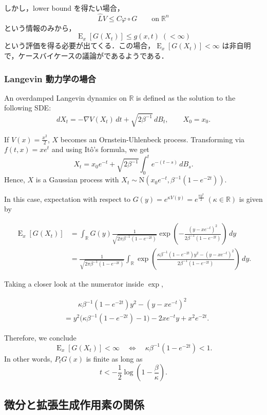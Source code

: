 \documentclass[
  11pt,
  jafont=noto-otf]{bxjsarticle}
\begin{document}
しかし，lower bound を得たい場合， \[
\widehat{L}V\le C\varphi\circ G\qquad\mathrm{on}\;\mathbb{R}^n
\] という情報のみから， \[
\operatorname{E}_x[G(X_t)]\le g(x,t)\;(<\infty)
\]
という評価を得る必要が出てくる．この場合，\(\operatorname{E}_x[G(X_t)]<\infty\)
は非自明で，ケースバイケースの議論がであるようである．

\subsubsection{Langevin
動力学の場合}\label{langevin-ux52d5ux529bux5b66ux306eux5834ux5408}

An overdamped Langevin dynamics on \(\mathbb{R}\) is defined as the
solution to the following SDE: \[
dX_t=-\nabla V(X_t)\,dt+\sqrt{2\beta^{-1}}\,dB_t,\qquad X_0=x_0.
\]

If \(V(x)=\frac{x^2}{2}\), \(X\) becomes an Ornstein-Uhlenbeck process.
Transforming via \(f(t,x)=xe^t\) and using Itô's formula, we get \[
X_t=x_0e^{-t}+\sqrt{2\beta^{-1}}\int^t_0e^{-(t-s)}\,dB_s.
\] Hence, \(X\) is a Gaussian process with
\(X_t\sim\mathrm{N}\left(x_0e^{-t},\beta^{-1}(1-e^{-2t})\right)\).

In this case, expectation with respect to
\(G(y)=e^{\kappa V(y)}=e^{\frac{\kappa y^2}{2}}\;(\kappa\in\mathbb{R})\)
is given by

\begin{align*}
    \operatorname{E}_x[G(X_t)]&=\int_{\mathbb{R}} G(y)\frac{1}{\sqrt{2\pi\beta^{-1}(1-e^{-2t})}}\exp\left(-\frac{(y-xe^{-t})^2}{2\beta^{-1}(1-e^{-2t})}\right)\,dy\\
    &=\frac{1}{\sqrt{2\pi\beta^{-1}(1-e^{-2t})}}\int_{\mathbb{R}}\exp\left(\frac{\kappa\beta^{-1}(1-e^{-2t})y^2-(y-xe^{-t})^2}{2\beta^{-1}(1-e^{-2t})}\right)\,dy.
\end{align*}

Taking a closer look at the numerator inside \(\exp\),

\begin{align*}
    &\qquad\kappa\beta^{-1}(1-e^{-2t})y^2-(y-xe^{-t})^2\\
    &=y^2\biggr(\kappa\beta^{-1}(1-e^{-2t})-1\biggl)-2xe^{-t}y+x^2e^{-2t}.
\end{align*}

Therefore, we conclude \[
\operatorname{E}_x[G(X_t)]<\infty\quad\Leftrightarrow\quad\kappa\beta^{-1}(1-e^{-2t})<1.
\] In other words, \(P_tG(x)\) is finite as long as \[
t<-\frac{1}{2}\log\left(1-\frac{\beta}{\kappa}\right).
\]

\subsection{微分と拡張生成作用素の関係}\label{ux5faeux5206ux3068ux62e1ux5f35ux751fux6210ux4f5cux7528ux7d20ux306eux95a2ux4fc2}
\end{document}
